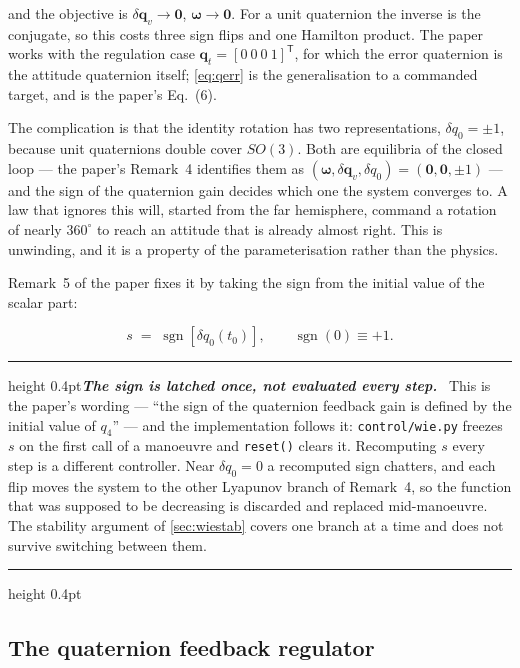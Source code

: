 \documentclass[conference,10pt,a4paper]{IEEEtran}
\newcommand{\remarkrule}{\par\nobreak\vspace{2pt}%
  \hrule height 0.4pt\vspace{4pt}\nobreak}
\newenvironment{cautionbox}[1][Caveat]
  {\par\medskip\remarkrule\noindent\small\textbf{\textit{#1.}}\ \ignorespaces}
  {\par\vspace{3pt}\hrule height 0.4pt\par\medskip\ignorespacesafterend}
\newcommand{\vect}[1]{\bm{#1}}
\newcommand{\T}{^{\mathsf{T}}}
\DeclareMathOperator{\sgn}{sgn}
\begin{document}
and the objective is $\delta\vect{q}_v\to\vect{0}$, $\vect{\omega}\to\vect{0}$.
For a unit quaternion the inverse is the conjugate, so this costs three sign
flips and one Hamilton product. The paper works with the regulation case
$\vect{q}_t=[0\ 0\ 0\ 1]\T$, for which the error quaternion is the attitude
quaternion itself; \cref{eq:qerr} is the generalisation to a commanded target,
and is the paper's Eq.~(6).

The complication is that the identity rotation has two representations,
$\delta q_0=\pm1$, because unit quaternions double cover $SO(3)$. Both are
equilibria of the closed loop --- the paper's Remark~4 identifies them as
$(\vect{\omega},\delta\vect{q}_v,\delta q_0)=(\vect{0},\vect{0},\pm1)$ --- and
the sign of the quaternion gain decides which one the system converges to. A
law that ignores this will, started from the far hemisphere, command a rotation
of nearly $360^\circ$ to reach an attitude that is already almost right. This
is unwinding, and it is a property of the parameterisation rather than the
physics.

Remark~5 of the paper fixes it by taking the sign from the initial value of the
scalar part:

\begin{equation}
s \;=\; \sgn\!\left[\delta q_0(t_0)\right],
\qquad \sgn(0)\equiv+1 .
\label{eq:safesign}
\end{equation}

\begin{cautionbox}[The sign is latched once, not evaluated every step]
This is the paper's wording --- ``the sign of the quaternion feedback gain is
defined by the initial value of $q_4$'' --- and the implementation follows it:
\texttt{control/wie.py} freezes $s$ on the first call of a manoeuvre and
\texttt{reset()} clears it. Recomputing $s$ every step is a different
controller. Near $\delta q_0=0$ a recomputed sign chatters, and each flip moves
the system to the other Lyapunov branch of Remark~4, so the function that was
supposed to be decreasing is discarded and replaced mid-manoeuvre. The
stability argument of \cref{sec:wiestab} covers one branch at a time and does
not survive switching between them.
\end{cautionbox}

\subsection{The quaternion feedback regulator}
\label{sec:wie}
\end{document}
